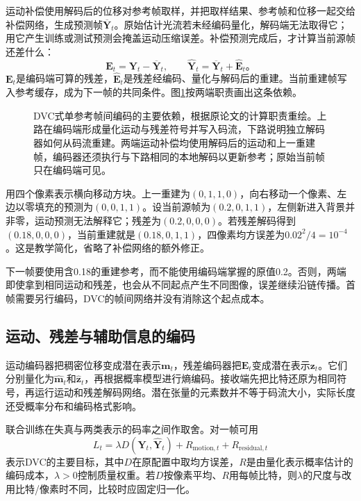 运动补偿使用解码后的位移对参考帧取样，并把取样结果、参考帧和位移一起交给补偿网络，生成预测帧$\overline{\bm{Y}}_t$。原始估计光流若未经编码量化，解码端无法取得它；用它产生训练或测试预测会掩盖运动压缩误差。补偿预测完成后，才计算当前源帧还差什么：
\begin{equation}
  \bm{E}_t=\bm{Y}_t-\overline{\bm{Y}}_t,\qquad
  \widehat{\bm{Y}}_t=\overline{\bm{Y}}_t+\widehat{\bm{E}}_t\text{。}
  \label{eq:vision-video-dvc-reconstruction}
\end{equation}
$\bm{E}_t$是编码端可算的残差，$\widehat{\bm{E}}_t$是残差经编码、量化与解码后的重建。当前重建帧写入参考缓存，成为下一帧的共同条件。图\ref{fig:vision-dvc-reference}按两端职责画出这条依赖。

\begin{figure}[htbp]
  \centering
  
  \caption{DVC式单参考帧间编码的主要依赖，根据原论文的计算职责重绘。上路在编码端形成量化运动与残差符号并写入码流，下路说明独立解码器如何从码流重建。两端运动补偿均使用解码后的运动和上一重建帧，编码器还须执行与下路相同的本地解码以更新参考；原始当前帧只在编码端可见。}
  \label{fig:vision-dvc-reference}
\end{figure}
\FloatBarrier

用四个像素表示横向移动方块。上一重建为$(0,1,1,0)$，向右移动一个像素、左边以零填充的预测为$(0,0,1,1)$。设当前源帧为$(0.2,0,1,1)$，左侧新进入背景并非零，运动预测无法解释它；残差为$(0.2,0,0,0)$。若残差解码得到$(0.18,0,0,0)$，当前重建就是$(0.18,0,1,1)$，四像素均方误差为$0.02^2/4=10^{-4}$。这是教学简化，省略了补偿网络的额外修正。

下一帧要使用含0.18的重建参考，而不能使用编码端掌握的原值0.2。否则，两端即使拿到相同运动和残差，也会从不同起点产生不同图像，误差继续沿链传播。首帧需要另行编码，DVC的帧间网络并没有消除这个起点成本。

\subsection{运动、残差与辅助信息的编码}
\label{sec:vision-video-rate-allocation}

运动编码器把稠密位移变成潜在表示$\bm{m}_t$，残差编码器把$\bm{E}_t$变成潜在表示$\bm{z}_t$。它们分别量化为$\widehat{\bm{m}}_t$和$\widehat{\bm{z}}_t$，再根据概率模型进行熵编码。接收端先把比特还原为相同符号，再运行运动和残差解码网络。潜在张量的元素数并不等于码流大小，实际长度还受概率分布和编码格式影响。

联合训练在失真与两类表示的码率之间作取舍。对一帧可用
\begin{equation}
  L_t=\lambda D(\bm{Y}_t,\widehat{\bm{Y}}_t)
       +R_{\mathrm{motion},t}+R_{\mathrm{residual},t}
  \label{eq:vision-video-rate-distortion}
\end{equation}
表示DVC的主要目标，其中$D$在原配置中取均方误差，$R$是由量化表示概率估计的编码成本，$\lambda>0$控制质量权重。若$D$按像素平均、$R$用每帧比特，则$\lambda$的尺度与改用比特/像素时不同，比较时应固定归一化。

